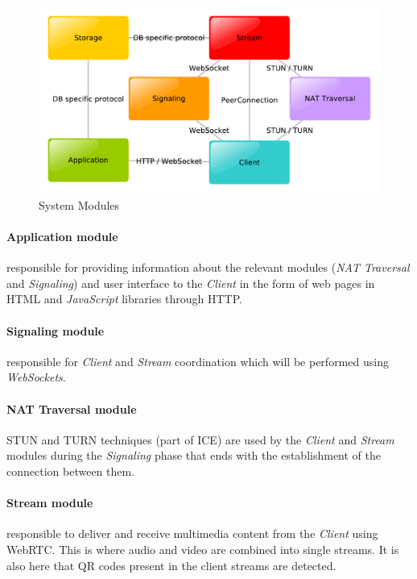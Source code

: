 \documentclass[10pt,conference]{IEEEtran}
\begin{document}
\begin{figure}
	\centering
	\includegraphics[width=\linewidth]{figures/modules.pdf}
	\caption{System Modules}
    \label{fig:modules}
\end{figure}

\paragraph{Application module} responsible for providing information about the relevant modules (\emph{NAT Traversal} and \emph{Signaling}) and user interface to the \emph{Client} in the form of web pages in \gls{HTML} and \emph{JavaScript} libraries through \gls{HTTP}.
 
\paragraph{Signaling module} responsible for \emph{Client} and \emph{Stream} coordination which will be performed using \emph{WebSockets}.

\paragraph{NAT Traversal module} \gls{STUN} and \gls{TURN} techniques (part of \gls{ICE}) are used by the \emph{Client} and \emph{Stream} modules during the \emph{Signaling} phase that ends with the establishment of the connection between them.

\paragraph{Stream module} responsible to deliver and receive multimedia content from the \emph{Client} using \gls{WebRTC}. This is where audio and video are combined into single streams. It is also here that \gls{QR} codes present in the client streams are detected.
\end{document}
